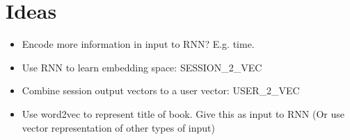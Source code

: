 \chapter{Ideas}

\begin{itemize}
	\item Encode more information in input to RNN? E.g. time.
	\item Use RNN to learn embedding space: SESSION\_2\_VEC
	\item Combine session output vectors to a user vector: USER\_2\_VEC
	\item Use word2vec to represent title of book. Give this as input to RNN (Or use vector representation of other types of input)
\end{itemize}